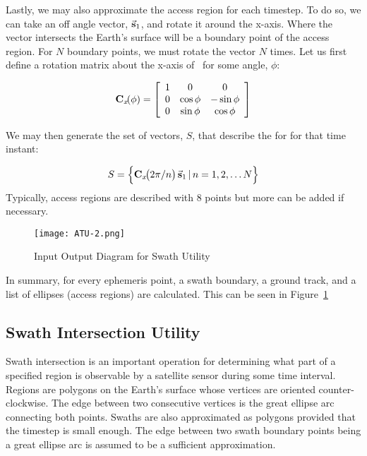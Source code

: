 \newcommand{\Cx}[1]{\ses{C}{x}\!\!\left(#1 \right)}

Lastly, we may also approximate the access region for each timestep. To do so,
we can take an off angle vector, $\vec{\bm{\mathrm{s}}}_{1}$, and rotate it around the
x-axis. Where the vector intersects the Earth's surface will be a boundary
point of the access region. For $N$ boundary points, we must rotate the vector
$N$ times. Let us first define a rotation matrix about the x-axis of \Fo~for
some angle, $\phi$:

\begin{equation}
    \Cx{\phi} = 
    \left[
	\begin{array}{ccc}
	1  & 0 & 0   \\
	0 & \cos\phi  & -\sin\phi   \\
	0 & \sin\phi  & \cos\phi
    \end{array}
    \right]
\end{equation}

We may then generate the set of vectors, $S$, that describe the \gls{for} for
that time instant:

\begin{equation}
    S = \left\{ \Cx{2\pi/n} \sesv{s}{1} \, \vert \, n = 1, 2, \ldots N \right\}
\end{equation}
Typically, access regions are described with 8 points but more can be added if
necessary. 


\begin{figure}[h]
    \centering
    \texttt{[image: ATU-2.png]} 
    \caption{Input Output Diagram for Swath Utility}
    \label{fig:atu-2} 
\end{figure}

In summary, for every ephemeris point, a swath boundary, a ground track, and a
list of ellipses (access regions) are calculated. This can be seen in
Figure~\ref{fig:atu-2}


\subsection{Swath Intersection Utility}

Swath intersection is an important operation for determining what part of a
specified region is observable by a satellite sensor during some time interval.
Regions are polygons on the Earth’s surface whose vertices are oriented
counter-clockwise. The edge between two consecutive vertices is the great
ellipse arc connecting both points. Swaths are also approximated as polygons
provided that the timestep is small enough. The edge between two swath boundary
points being a great ellipse arc is assumed to be a sufficient approximation.

